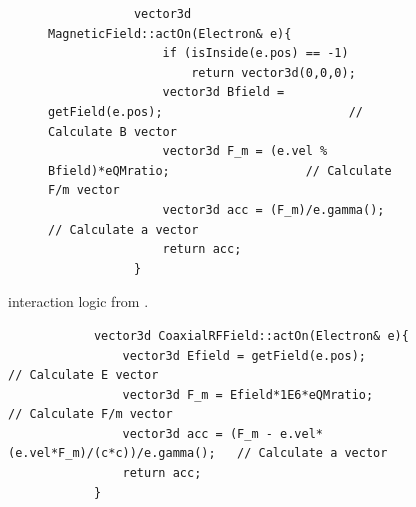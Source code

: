 \documentclass[a4paper,oneside,12pt]{report}
\numberwithin{equation}{chapter}
\begin{document}
{\begin{figure}[H]
    \begin{subfigure}{\textwidth}
        \begin{verbatim}
            vector3d MagneticField::actOn(Electron& e){
                if (isInside(e.pos) == -1)
                    return vector3d(0,0,0);
                vector3d Bfield = getField(e.pos);                          // Calculate B vector
                vector3d F_m = (e.vel % Bfield)*eQMratio;                   // Calculate F/m vector
                vector3d acc = (F_m)/e.gamma();                             // Calculate a vector
                return acc;
            }
        \end{verbatim}
    \end{subfigure}
    \caption{\eEM  interaction logic from .}
    \label{fig:3D_e_EM_interaction_first}
\end{figure} \fi
\iffalse \vspace{20pt}
\begin{figure}[H]
    \begin{minipage}{\textwidth}
        \begin{verbatim}
            vector3d CoaxialRFField::actOn(Electron& e){
                vector3d Efield = getField(e.pos);                          // Calculate E vector
                vector3d F_m = Efield*1E6*eQMratio;                         // Calculate F/m vector
                vector3d acc = (F_m - e.vel*(e.vel*F_m)/(c*c))/e.gamma();   // Calculate a vector
                return acc;
            }
        \end{verbatim}
    \end{minipage}


\end{figure}}
\end{document}
